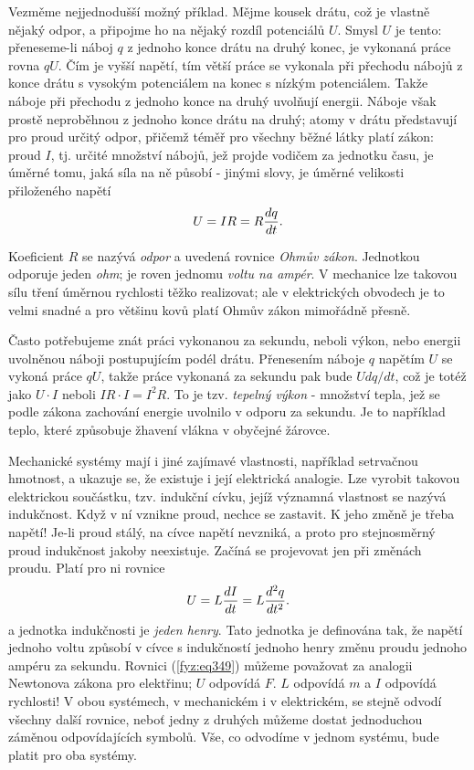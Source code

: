 {    Vezměme nejjednodušší možný příklad. Mějme kousek drátu, což je vlastně nějaký odpor, a 
    připojme ho na nějaký rozdíl potenciálů \(U\). Smysl \(U\) je tento: přeneseme-li náboj \(q\) z 
    jednoho konce drátu na druhý konec, je vykonaná práce rovna \(qU\). Čím je vyšší napětí, tím 
    větší práce se vykonala při přechodu nábojů z konce drátu s vysokým potenciálem na konec s 
    nízkým potenciálem. Takže náboje při přechodu z jednoho konce na druhý uvolňují energii. Náboje 
    však prostě neproběhnou z jednoho konce drátu na druhý; atomy v drátu představují pro proud 
    určitý odpor, přičemž téměř pro všechny běžné látky platí zákon: proud \(I\), tj. určité 
    množství nábojů, jež projde vodičem za jednotku času, je úměrné tomu, jaká síla na ně 
    působí - jinými slovy, je úměrné velikosti přiloženého napětí
    \begin{equation}\label{fyz:eq348}
      U = IR = R\dfrac{d q}{d t}.
    \end{equation}
    
    Koeficient \(R\) se nazývá \emph{odpor} a uvedená rovnice \emph{Ohmův zákon}. Jednotkou 
    odporuje jeden \emph{ohm}; je roven jednomu \emph{voltu na ampér}. V mechanice lze takovou sílu 
    tření úměrnou rychlosti těžko realizovat; ale v elektrických obvodech je to velmi snadné a pro 
    většinu kovů platí Ohmův zákon mimořádně přesně. 
    
    Často potřebujeme znát práci vykonanou za sekundu, neboli výkon, nebo energii uvolněnou náboji 
    postupujícím podél drátu. Přenesením náboje \(q\) napětím \(U\) se vykoná práce \(qU\), takže 
    práce vykonaná za sekundu pak bude \(Udq/dt\), což je totéž jako \(U\cdot I\) neboli \(IR\cdot 
    I=I^2R\). To je tzv. \emph{tepelný výkon} - množství tepla, jež se podle zákona zachování 
    energie uvolnilo v odporu za sekundu. Je to například teplo, které způsobuje žhavení vlákna v 
    obyčejné žárovce.
    
    Mechanické systémy mají i jiné zajímavé vlastnosti, například setrvačnou hmotnost, a ukazuje 
    se, že existuje i její elektrická analogie. Lze vyrobit takovou elektrickou součástku, tzv. 
    indukční cívku, jejíž významná vlastnost se nazývá indukčnost. Když v ní vznikne proud, nechce 
    se zastavit. K jeho změně je třeba napětí! Je-li proud stálý, na cívce napětí nevzniká, a proto 
    pro stejnosměrný proud indukčnost jakoby neexistuje. Začíná se projevovat jen při změnách 
    proudu. Platí pro ni rovnice
    \begin{equation}\label{fyz:eq349}
      U = L\dfrac{d I}{d t} = L\dfrac{d^2 q}{d t^2}.
    \end{equation}
    a jednotka indukčnosti je \emph{jeden henry}. Tato jednotka je definována tak, že napětí 
    jednoho voltu způsobí v cívce s indukčností jednoho henry změnu proudu jednoho ampéru za 
    sekundu. Rovnici (\ref{fyz:eq349}) můžeme považovat za analogii Newtonova zákona pro elektřinu; 
    \(U\) odpovídá \(F\). \(L\) odpovídá \(m\) a \(I\) odpovídá rychlosti! V obou systémech, v 
    mechanickém i v elektrickém, se stejně odvodí všechny další rovnice, neboť jedny z druhých 
    můžeme dostat jednoduchou záměnou odpovídajících symbolů. Vše, co odvodíme v jednom systému, 
    bude platit pro oba systémy.
    
}
